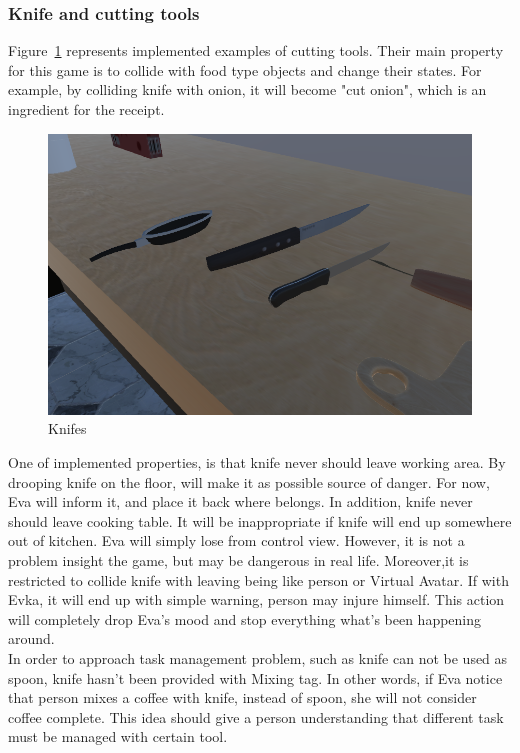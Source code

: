 \documentclass[18pt]{article}
\numberwithin{equation}{section} %
\numberwithin{figure}{section} %
\numberwithin{table}{section} %
\begin{document}
		\subsubsection{Knife and cutting tools}
			Figure~\ref{fig:knife_spoon} represents implemented examples of cutting tools. Their main property for this game is to collide with food type objects and change their states. For example, by colliding knife with onion, it will become "cut onion", which is an ingredient for the receipt. \\
				\begin{figure}[H]
					\centering
					\includegraphics[width=0.5\linewidth]{images/knife_spoon}
					\caption{Knifes}
					\label{fig:knife_spoon}
				\end{figure}
			One of implemented properties, is that knife never should leave working area. By drooping knife on the floor, will make it as possible source of danger. For now, Eva will inform it, and place it back where belongs. In addition, knife never should leave cooking table. It will be inappropriate if knife will end up somewhere out of kitchen. Eva will simply lose from control view. However, it is not a problem insight the game, but may be dangerous in real life. Moreover,it is restricted to collide knife with leaving being like person or Virtual Avatar. If with Evka, it will end up with simple warning, person may injure himself. This action will completely drop Eva's mood and stop everything what's been happening around. \\
			In order to approach task management problem, such as knife can not be used as spoon, knife hasn't been provided with Mixing tag. In other words, if Eva notice that person mixes a coffee with knife, instead of spoon, she will not consider coffee complete. This idea should give a person understanding that different task must be managed with certain tool. \\
			
\end{document}
